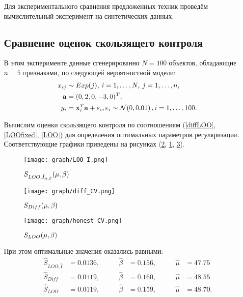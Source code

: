 Для экспериментального сравнения предложенных техник проведём вычислительный эксперимент на синтетических данных.

\subsection{Сравнение оценок скользящего контроля} %
В этом эксперименте данные сгенерированно $N=100$ объектов, обладающие $n=5$ признаками, по следующей вероятностной модели:
	\begin{align*}
		x_{ij} &\sim Exp(j), \: i=1,\ldots,N, \: j=1,\ldots,n,\\
		\boldsymbol{\mathbf{a}} &= (0, 2, 0, -3, 0)^T, \\
		y_{i} &= \boldsymbol{\mathbf{x}}_i^T \boldsymbol{\mathbf{a}} + {\varepsilon}_i, {\varepsilon}_i \sim \mathcal{N}\!\left(0,0{.}01\right), i=1,\ldots,100. 
	\end{align*}

Вычислим оценки скользящего контроля по соотношениям (\ref{diffLOO}, \ref{LOOfixed}, \ref{LOO}) для определения оптимальных параметров регуляризации. Соответствующие графики приведены на рисунках (\ref{pic:diffLOO}, \ref{pic:LOOfixed}, \ref{pic:LOO}).

\begin{figure}[H]
	\label{pic:LOOfixed}
	\centering
	\texttt{[image: graph/LOO\_I.png]}
	\caption{$S_{LOO, \hat I_{\mu,\beta}}({\mu,\beta})$}
\end{figure}

\begin{figure}[H]
	\label{pic:diffLOO}
	\centering
	\texttt{[image: graph/diff\_CV.png]}
	\caption{$S_{Diff}({\mu,\beta})$}
\end{figure}

\begin{figure}[H]
	\label{pic:LOO}
	\centering
	\texttt{[image: graph/honest\_CV.png]}
	\caption{$S_{LOO}({\mu,\beta})$}
\end{figure}

При этом оптимальные значения оказались равными:
\begin{align*}
	\hat S_{LOO, \hat I} 	&=0.0136, &\qquad	\hat \beta&=0.156, &\qquad	\hat \mu&=47.75 \\
	\hat S_{Diff} 			&=0.0119, &\qquad	\hat \beta&=0.160, &\qquad	\hat \mu&=48.55 \\
	\hat S_{LOO} 			&=0.0119, &\qquad	\hat \beta&=0.159, &\qquad	\hat \mu&=48.70.
\end{align*}


